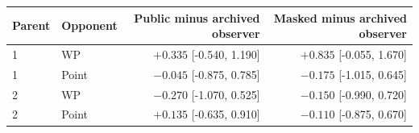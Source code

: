 \begin{tabular}{llrr}
\toprule
Parent & Opponent & Public minus archived observer & Masked minus archived observer \\
\midrule
1 & WP & $+0.335$ [-0.540, 1.190] & $+0.835$ [-0.055, 1.670] \\
1 & Point & $-0.045$ [-0.875, 0.785] & $-0.175$ [-1.015, 0.645] \\
2 & WP & $-0.270$ [-1.070, 0.525] & $-0.150$ [-0.990, 0.720] \\
2 & Point & $+0.135$ [-0.635, 0.910] & $-0.110$ [-0.875, 0.670] \\
\bottomrule
\end{tabular}
